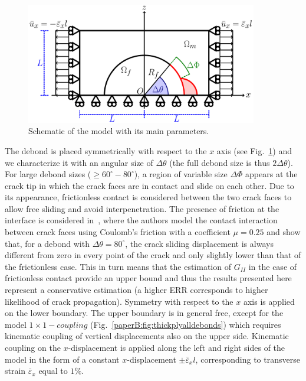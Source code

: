 \begin{figure}[!h]
\centering
        \includegraphics[width=0.9\textwidth]{paperB/RUC.pdf}

\caption{Schematic of the model with its main parameters.}\label{paperB:subfig:modelschem}
\end{figure}

The debond is placed symmetrically with respect to the $x$ axis (see Fig.~\ref{paperB:subfig:modelschem}) and we characterize it with an angular size of $\Delta\theta$ (the full debond size is thus $2\Delta\theta$). For large debond sizes ($\geq 60^{\circ}-80^{\circ}$), a region of variable size $\Delta\Phi$ appears at the crack tip in which the crack faces are in contact and slide on each other. Due to its appearance, frictionless contact is considered between the two crack faces to allow free sliding and avoid interpenetration. The presence of friction at the interface is considered in~\cite{Varna1997}, where the authors model the contact interaction between crack faces using Coulomb's friction with a coefficient $\mu=0.25$ and show that, for a debond with $\Delta\theta=80^{\circ}$, the crack sliding displacement is always different from zero in every point of the crack and only slightly lower than that of the frictionless case. This in turn means that the estimation of $G_{II}$ in the case of frictionless contact provide an upper bound and thus the results presented here represent a conservative estimation (a higher ERR corresponds to higher likelihood of crack propagation). Symmetry with respect to the $x$ axis is applied on the lower boundary. The upper boundary is in general free, except for the model $1\times 1-coupling$ (Fig.~\ref{paperB:fig:thickplyalldebonds}) which requires kinematic coupling of vertical displacements also on the upper side. Kinematic coupling on the $x$-displacement is applied along the left and right sides of the model in the form of a constant $x$-displacement $\pm\bar{\varepsilon}_{x} l$, corresponding to transverse strain $\bar{\varepsilon}_{x}$ equal to $1\%$.

